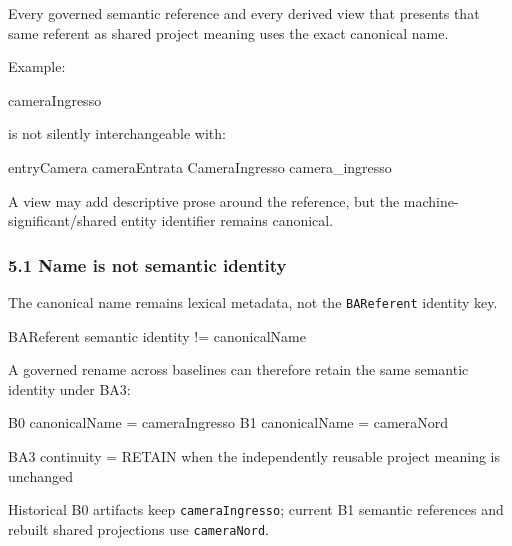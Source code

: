 \documentclass[
  10pt,
  a4paper,
]{article}
\newenvironment{Shaded}{}{}
\newcommand{\NormalTok}[1]{#1}
\begin{document}
Every governed semantic reference and every derived view that presents
that same referent as shared project meaning uses the exact canonical
name.

Example:

\begin{Shaded}
\begin{Highlighting}[]
\NormalTok{cameraIngresso}
\end{Highlighting}
\end{Shaded}

is not silently interchangeable with:

\begin{Shaded}
\begin{Highlighting}[]
\NormalTok{entryCamera}
\NormalTok{cameraEntrata}
\NormalTok{CameraIngresso}
\NormalTok{camera\_ingresso}
\end{Highlighting}
\end{Shaded}

A view may add descriptive prose around the reference, but the
machine-significant/shared entity identifier remains canonical.

\subsubsection{5.1 Name is not semantic
identity}\label{51-name-is-not-semantic-identity}

The canonical name remains lexical metadata, not the \texttt{BAReferent}
identity key.

\begin{Shaded}
\begin{Highlighting}[]
\NormalTok{BAReferent semantic identity != canonicalName}
\end{Highlighting}
\end{Shaded}

A governed rename across baselines can therefore retain the same
semantic identity under BA3:

\begin{Shaded}
\begin{Highlighting}[]
\NormalTok{B0  canonicalName = cameraIngresso}
\NormalTok{B1  canonicalName = cameraNord}

\NormalTok{BA3 continuity = RETAIN}
\NormalTok{    when the independently reusable project meaning is unchanged}
\end{Highlighting}
\end{Shaded}

Historical B0 artifacts keep \texttt{cameraIngresso}; current B1
semantic references and rebuilt shared projections use
\texttt{cameraNord}.
\end{document}

